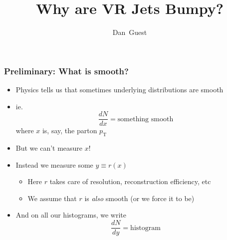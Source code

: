 \documentclass[xcolor={table}]{beamer}
\title{Why are VR Jets Bumpy?}
\author[dguest@cern.ch]{Dan~Guest}
\institute[UCI]{UC~Irvine}
\newcommand{\pt}{p_{\mathrm{T}}}
\begin{document}
\begin{frame}
  \maketitle
\end{frame}

\begin{frame}
  \frametitle{Preliminary: What is smooth?}
  \begin{itemize}
  \item Physics tells us that sometimes underlying distributions are smooth
  \item ie.
    \[ \frac{dN}{dx} = \text{something smooth} \]
    where $x$ is, say, the parton $\pt$
  \item But we can't measure $x$!
  \item Instead we measure some $y \equiv r(x)$
    \begin{itemize}
    \item Here $r$ takes care of resolution, reconstruction efficiency, etc
    \item We assume that $r$ is \emph{also} smooth (or we force it to be)
    \end{itemize}
  \item And on all our histograms, we write
    \[ \frac{dN}{dy} = \text{histogram} \]
  \end{itemize}
\end{frame}
\end{document}
